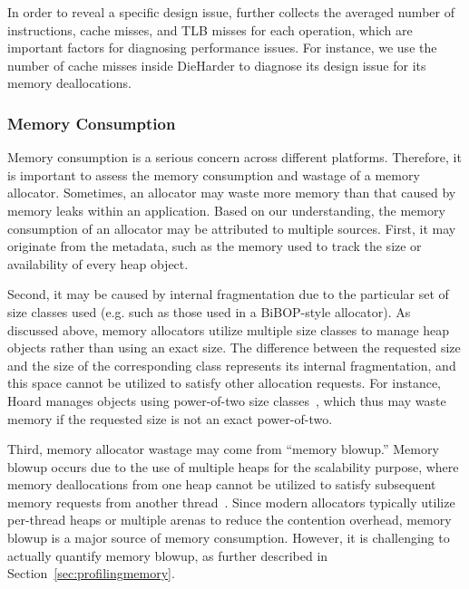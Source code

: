 In order to reveal a specific design issue, \MP{} further collects the averaged number of instructions, cache misses, and TLB misses for each operation, which are important factors for diagnosing performance issues. For instance, we use the number of cache misses inside DieHarder to diagnose its design issue for its memory deallocations. 

\subsubsection{Memory Consumption}
\label{sec:memoryconsumption}

Memory consumption is a serious concern across different platforms. Therefore, it is important to assess the memory consumption and wastage of a memory allocator. Sometimes, an allocator may waste more memory than that caused by memory leaks within an application. Based on our understanding, the memory consumption of an allocator may be attributed to multiple sources. First, it may originate from the metadata, such as the memory used to track the size or availability of every heap object. 

Second, it may be caused by internal fragmentation due to the particular set of size classes used (e.g. such as those used in a BiBOP-style allocator). As discussed above, memory allocators utilize multiple size classes to manage heap objects rather than using an exact size. The difference between the requested size and the size of the corresponding class represents its internal fragmentation, and this space cannot be utilized to satisfy other allocation requests. For instance, Hoard manages objects using power-of-two size classes~\citep{Hoard}, which thus may waste memory if the requested size is not an exact power-of-two. 
 
Third, memory allocator wastage may come from ``memory blowup.'' Memory blowup occurs due to the use of multiple heaps for the scalability purpose, where memory deallocations from one heap cannot be utilized to satisfy subsequent memory requests from another thread~\cite{Hoard}. 
Since modern allocators typically utilize per-thread heaps or multiple arenas to reduce the contention overhead, memory blowup is a major source of memory consumption. However, it is challenging to actually quantify memory blowup, as further described in Section~\ref{sec:profilingmemory}.   


